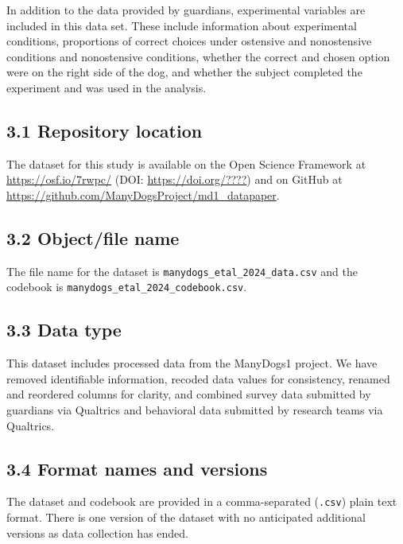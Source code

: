 \documentclass[
  man,floatsintext]{apa6}
\begin{document}
In addition to the data provided by guardians, experimental variables are included in this data set. These include information about experimental conditions, proportions of correct choices under ostensive and nonostensive conditions and nonostensive conditions, whether the correct and chosen option were on the right side of the dog, and whether the subject completed the experiment and was used in the analysis.

\hypertarget{repository-location}{%
\subsection{3.1 Repository location}\label{repository-location}}

The dataset for this study is available on the Open Science Framework at \url{https://osf.io/7rwpc/} (DOI: \url{https://doi.org/????}) and on GitHub at \url{https://github.com/ManyDogsProject/md1_datapaper}.

\hypertarget{objectfile-name}{%
\subsection{3.2 Object/file name}\label{objectfile-name}}

The file name for the dataset is \texttt{manydogs\_etal\_2024\_data.csv} and the codebook is \texttt{manydogs\_etal\_2024\_codebook.csv}.

\hypertarget{data-type}{%
\subsection{3.3 Data type}\label{data-type}}

This dataset includes processed data from the ManyDogs1 project. We have removed identifiable information, recoded data values for consistency, renamed and reordered columns for clarity, and combined survey data submitted by guardians via Qualtrics and behavioral data submitted by research teams via Qualtrics.

\hypertarget{format-names-and-versions}{%
\subsection{3.4 Format names and versions}\label{format-names-and-versions}}

The dataset and codebook are provided in a comma-separated (\texttt{.csv}) plain text format. There is one version of the dataset with no anticipated additional versions as data collection has ended.
\end{document}
